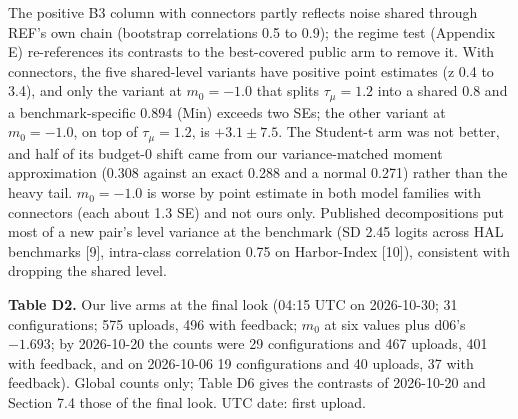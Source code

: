 \documentclass[
]{article}
\begin{document}
The positive B3 column with connectors partly reflects noise shared
through REF's own chain (bootstrap correlations 0.5 to 0.9); the regime
test (Appendix E) re-references its contrasts to the best-covered public
arm to remove it. With connectors, the five shared-level variants have
positive point estimates (z 0.4 to 3.4), and only the variant at
\(m_0 = -1.0\) that splits \(\tau_\mu = 1.2\) into a shared 0.8 and a
benchmark-specific 0.894 (Min) exceeds two SEs; the other variant at
\(m_0 = -1.0\), on top of \(\tau_\mu = 1.2\), is \(+3.1 \pm 7.5\). The
Student-t arm was not better, and half of its budget-0 shift came from
our variance-matched moment approximation (0.308 against an exact 0.288
and a normal 0.271) rather than the heavy tail. \(m_0 = -1.0\) is worse
by point estimate in both model families with connectors (each about 1.3
SE) and not ours only. Published decompositions put most of a new pair's
level variance at the benchmark (SD 2.45 logits across HAL benchmarks
{[}9{]}, intra-class correlation 0.75 on Harbor-Index {[}10{]}),
consistent with dropping the shared level.

\textbf{Table D2.} Our live arms at the final look (04:15 UTC on
2026-10-30; 31 configurations; 575 uploads, 496 with feedback; \(m_0\)
at six values plus d06's \(-1.693\); by 2026-10-20 the counts were 29
configurations and 467 uploads, 401 with feedback, and on 2026-10-06 19
configurations and 40 uploads, 37 with feedback). Global counts only;
Table D6 gives the contrasts of 2026-10-20 and Section 7.4 those of the
final look. UTC date: first upload.
\end{document}
